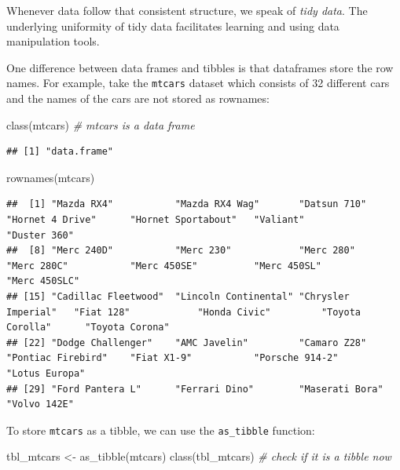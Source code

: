 \documentclass[
  12pt,
  oneside]{book}
\newenvironment{Shaded}{\begin{snugshade}}{\end{snugshade}}
\newcommand{\CommentTok}[1]{\textcolor[rgb]{0.56,0.35,0.01}{\textit{#1}}}
\newcommand{\FunctionTok}[1]{\textcolor[rgb]{0.00,0.00,0.00}{#1}}
\newcommand{\NormalTok}[1]{#1}
\newcommand{\OtherTok}[1]{\textcolor[rgb]{0.56,0.35,0.01}{#1}}
\theoremstyle{definition}
\theoremstyle{definition}
\theoremstyle{definition}
\theoremstyle{definition}
\theoremstyle{remark}
\begin{document}
Whenever data follow that consistent structure, we speak of \emph{tidy data}. The underlying uniformity of tidy data facilitates learning and using data manipulation tools.

One difference between data frames and tibbles is that dataframes store the row names. For example, take the \texttt{mtcars} dataset which consists of 32 different cars and the names of the cars are not stored as rownames:

\begin{Shaded}
\begin{Highlighting}[]
\FunctionTok{class}\NormalTok{(mtcars) }\CommentTok{\# mtcars is a data frame}
\end{Highlighting}
\end{Shaded}

\begin{verbatim}
## [1] "data.frame"
\end{verbatim}

\begin{Shaded}
\begin{Highlighting}[]
\FunctionTok{rownames}\NormalTok{(mtcars) }
\end{Highlighting}
\end{Shaded}

\begin{verbatim}
##  [1] "Mazda RX4"           "Mazda RX4 Wag"       "Datsun 710"          "Hornet 4 Drive"      "Hornet Sportabout"   "Valiant"             "Duster 360"         
##  [8] "Merc 240D"           "Merc 230"            "Merc 280"            "Merc 280C"           "Merc 450SE"          "Merc 450SL"          "Merc 450SLC"        
## [15] "Cadillac Fleetwood"  "Lincoln Continental" "Chrysler Imperial"   "Fiat 128"            "Honda Civic"         "Toyota Corolla"      "Toyota Corona"      
## [22] "Dodge Challenger"    "AMC Javelin"         "Camaro Z28"          "Pontiac Firebird"    "Fiat X1-9"           "Porsche 914-2"       "Lotus Europa"       
## [29] "Ford Pantera L"      "Ferrari Dino"        "Maserati Bora"       "Volvo 142E"
\end{verbatim}

To store \texttt{mtcars} as a tibble, we can use the \texttt{as\_tibble} function:

\begin{Shaded}
\begin{Highlighting}[]
\NormalTok{tbl\_mtcars }\OtherTok{\textless{}{-}} \FunctionTok{as\_tibble}\NormalTok{(mtcars)}
\FunctionTok{class}\NormalTok{(tbl\_mtcars) }\CommentTok{\# check if it is a tibble now}
\end{Highlighting}
\end{Shaded}
\end{document}
